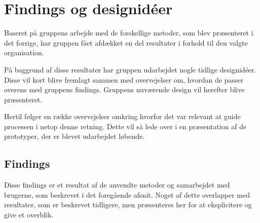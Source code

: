 \chapter{Findings og designidéer}
Baseret på gruppens arbejde med de forskellige metoder, som blev præsenteret i det forrige, har gruppen fået afdækket en del resultater i forhold til den valgte organisation. 

På baggrund af disse resultater har gruppen udarbejdet nogle tidlige designidéer. Disse vil kort blive fremlagt sammen med overvejelser om, hvordan de passer overens med gruppens findings. 
Gruppens nuværende design vil herefter blive præsenteret. 

Hertil følger en række overvejelser omkring hvorfor det var relevant at guide processen i netop denne retning. Dette vil så lede over i en præsentation af de prototyper, der er blevet udarbejdet løbende.

\section{Findings}
Disse findings er et resultat af de anvendte metoder og samarbejdet med brugerne, som beskrevet i det foregående afsnit. Noget af dette overlapper med resultater, som er beskrevet tidligere, men præsenteres her for at eksplicitere og give et overblik.

